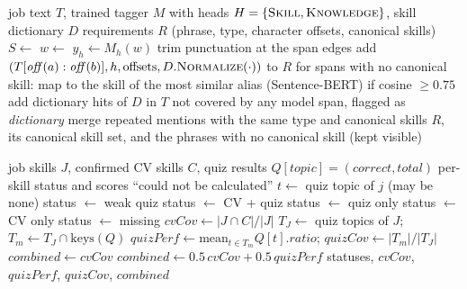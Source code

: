 
\begin{algorithm}[t]
\caption{Requirement extraction from a job ad}\label{alg:extract}
\begin{algorithmic}[1]
\Require job text $T$, trained tagger $M$ with heads $H=\{\textsc{Skill},\textsc{Knowledge}\}$, skill dictionary $D$
\Ensure requirements $R$ (phrase, type, character offsets, canonical skills)
\State $S \gets$  
  \State $w \gets$  
    \State $y_h \gets M_h(w)$ 
      \State trim punctuation at the span edges
      \State add $(T[\mathit{off}(a):\mathit{off}(b)], h, \text{offsets}, D.\textsc{Normalize}(\cdot))$ to $R$
    \EndFor
  \EndFor
\EndFor
\State for spans with no canonical skill: map to the skill of the most similar alias (Sentence-BERT) if cosine $\ge 0.75$
\State add dictionary hits of $D$ in $T$ not covered by any model span, flagged as \emph{dictionary}
\State merge repeated mentions with the same type and canonical skills
\State \Return $R$, its canonical skill set, and the phrases with no canonical skill (kept visible)
\end{algorithmic}
\end{algorithm}

\begin{algorithm}[t]
\caption{Explainable job match}\label{alg:match}
\begin{algorithmic}[1]
\Require job skills $J$, confirmed CV skills $C$, quiz results $Q[\mathit{topic}] = (\mathit{correct}, \mathit{total})$
\Ensure per-skill status and scores
 \State \Return ``could not be calculated'' \EndIf
{}
  \State $t \gets$ quiz topic of $j$ (may be none)
   \State status $\gets$ weak quiz
   \State status $\gets$ CV + quiz
   \State status $\gets$ quiz only
   \State status $\gets$ CV only
  \Else \State status $\gets$ missing
  \EndIf
\EndFor
\State $\mathit{cvCov} \gets |J \cap C| / |J|$
\State $T_J \gets$ quiz topics of $J$; \quad $T_m \gets T_J \cap \mathrm{keys}(Q)$
\State $\mathit{quizPerf} \gets \mathrm{mean}_{t \in T_m} Q[t].\mathit{ratio}$; \quad $\mathit{quizCov} \gets |T_m| / |T_J|$
 \State $\mathit{combined} \gets \mathit{cvCov}$ 
\Else \State $\mathit{combined} \gets 0.5\,\mathit{cvCov} + 0.5\,\mathit{quizPerf}$
\EndIf
\State \Return statuses, $\mathit{cvCov}$, $\mathit{quizPerf}$, $\mathit{quizCov}$, $\mathit{combined}$
\end{algorithmic}
\end{algorithm}

